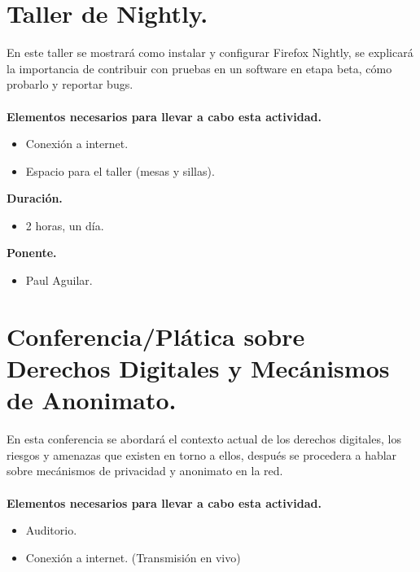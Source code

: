 \documentclass[a4paper,11pt]{article}                 %
\begin{document}
  
                \section{Taller de Nightly.}                                     %

   En este taller se mostrará como instalar y configurar Firefox Nightly, se explicará la importancia de contribuir con pruebas en un software en etapa beta, cómo probarlo y reportar bugs. 
      \paragraph{}
  \textbf{Elementos necesarios para llevar a cabo esta actividad.}
  \begin{itemize}
    \label{list:nightly}
    \item Conexión a internet.
    \item Espacio para el taller (mesas y sillas).
  \end{itemize}
  
  \textbf{Duración.}
  \begin{itemize}
    \item 2 horas, un día.
  \end{itemize}
  
              \textbf{Ponente.}
  \begin{itemize}
    \item Paul Aguilar.
  \end{itemize}
  
  \vspace{1 cm}
  
            \section{Conferencia/Plática sobre Derechos Digitales y Mecánismos de Anonimato.}                                     %

   En esta conferencia se abordará el contexto actual de los derechos digitales, los riesgos y amenazas que existen en torno a ellos, después se procedera a hablar sobre mecánismos de privacidad y anonimato en la red.
      \paragraph{}
  \textbf{Elementos necesarios para llevar a cabo esta actividad.}
  \begin{itemize}
    \label{list:ddigitales}
    \item Auditorio.
    \item Conexión a internet. (Transmisión en vivo)
  \end{itemize}
  
\end{document}
